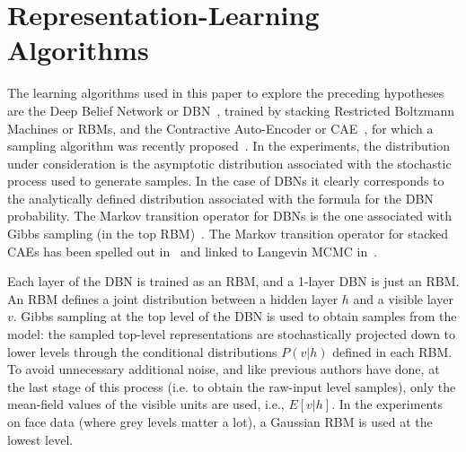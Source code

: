 \vspace*{-1.5mm}
\section{Representation-Learning Algorithms}
\vspace*{-1mm}

The learning algorithms used in this paper to explore the preceding hypotheses are
the Deep Belief Network or DBN~\citep{Hinton06}, trained by stacking
Restricted Boltzmann Machines or RBMs, and the Contractive Auto-Encoder or
CAE~\citep{Rifai+al-2011}, for which a sampling algorithm was
recently proposed~\citep{Rifai-icml2012}.
In the experiments, the distribution under consideration is the asymptotic distribution
associated with the stochastic process used to generate samples. In the
case of DBNs it clearly corresponds to the analytically defined
distribution associated with the formula for the DBN probability.  The
Markov transition operator for DBNs is the one associated with Gibbs
sampling (in the top RBM)~\citep{Hinton06}. The Markov transition operator for stacked CAEs
has been spelled out in~\citet{Rifai-icml2012} and linked to
Langevin MCMC in~\citet{Alain+al-arxiv-2012}. 

Each layer of the DBN is trained as an RBM, and a 1-layer DBN is just an RBM. An RBM
defines a joint distribution between a hidden layer $h$ and a visible layer $v$. 
Gibbs sampling at the top level of the DBN is used to obtain samples from the
model: the sampled top-level representations are stochastically projected
down to lower levels through the conditional distributions $P(v|h)$
defined in each RBM. To avoid unnecessary additional noise, and like
previous authors have done, at the last stage of this process (i.e.
to obtain the raw-input level samples), only the mean-field values
of the visible units are used, i.e., $E[v|h]$. In the experiments on face
data (where grey levels matter a lot), a Gaussian RBM is used at the
lowest level. 

